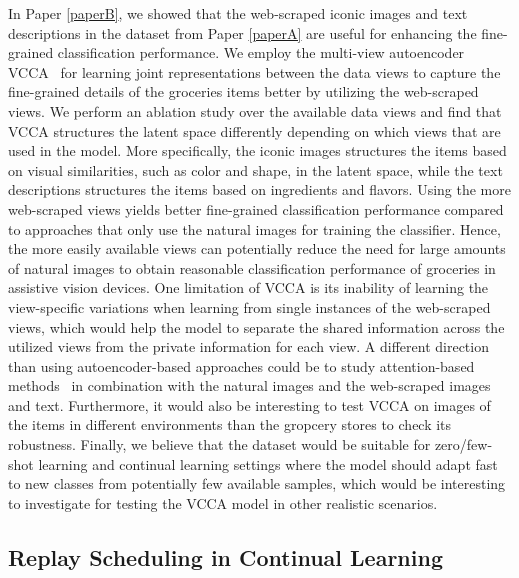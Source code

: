 In Paper \ref{paperB}, we showed that the web-scraped iconic images and text descriptions in the dataset from Paper \ref{paperA} are useful for enhancing the fine-grained classification performance. We employ the multi-view autoencoder VCCA~\cite{wang2016deep} for learning joint representations between the data views to capture the fine-grained details of the groceries items better by utilizing the web-scraped views. We perform an ablation study over the available data views and find that VCCA structures the latent space differently depending on which views that are used in the model. More specifically, the iconic images structures the items based on visual similarities, such as color and shape, in the latent space, while the text descriptions structures the items based on ingredients and flavors. Using the more web-scraped views yields better fine-grained classification performance compared to approaches that only use the natural images for training the classifier. Hence, the more easily available views can potentially reduce the need for large amounts of natural images to obtain reasonable classification performance of groceries in assistive vision devices. One limitation of VCCA is its inability of learning the view-specific variations when learning from single instances of the web-scraped views, which would help the model to separate the shared information across the utilized views from the private information for each view. A different direction than using autoencoder-based approaches could be to study attention-based methods~\cite{fu2017look, zheng2019looking, luong2015effective} in combination with the natural images and the web-scraped images and text. Furthermore, it would also be interesting to test VCCA on images of the items in different environments than the gropcery stores to check its robustness. Finally, we believe that the dataset would be suitable for zero/few-shot learning and continual learning settings where the model should adapt fast to new classes from potentially few available samples, which would be interesting to investigate for testing the VCCA model in other realistic scenarios. 


\subsection{Replay Scheduling in Continual Learning}

